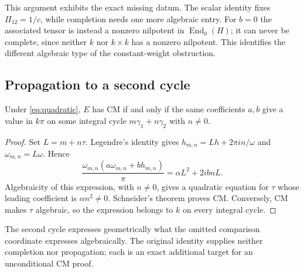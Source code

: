 This argument exhibits the exact missing datum.  The scalar identity
fixes $\Pi_{12}=1/c$, while completion needs one more algebraic entry.
For $b=0$ the associated tensor is instead a nonzero nilpotent in
$\operatorname{End}_0(H)$; it can never be complete, since neither
$k$ nor $k\times k$ has a nonzero nilpotent.  This identifies the
different algebraic type of the constant-weight obstruction.

\subsection{Propagation to a second cycle}\label{sec:two-cycles}
\begin{proposition}\label{prop:two-cycles}
Under \eqref{eq:quadratic}, $E$ has CM if and only if the same
coefficients $a,b$ give a value in $k\pi$ on some integral cycle
$m\gamma_1+n\gamma_2$ with $n\ne0$.
\end{proposition}
\begin{proof}
Set $L=m+n\tau$.  Legendre's identity gives
$h_{m,n}=Lh+2\pi in/\omega$ and $\omega_{m,n}=L\omega$.  Hence
\begin{equation}\label{eq:cycle-propagation}
 \frac{\omega_{m,n}(a\omega_{m,n}+bh_{m,n})}{\pi}
       =\alpha L^2+2ibnL.
\end{equation}
Algebraicity of this expression, with $n\ne0$, gives a quadratic
equation for $\tau$ whose leading coefficient is $\alpha n^2\ne0$.
Schneider's theorem proves CM.  Conversely, CM makes $\tau$ algebraic,
so the expression belongs to $k$ on every integral cycle.
\end{proof}
The second cycle expresses geometrically what the omitted comparison
coordinate expresses algebraically.  The original identity supplies
neither completion nor propagation; each is an exact additional target
for an unconditional CM proof.
